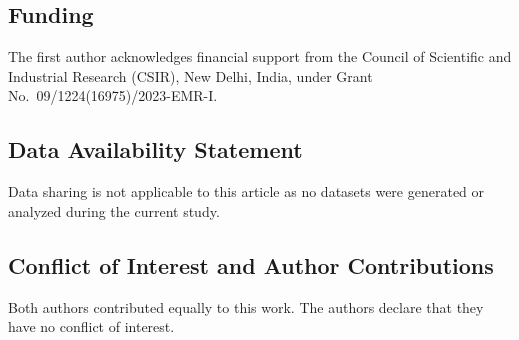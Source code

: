 \documentclass[11pt,reqno]{amsart}
\numberwithin{equation}{section}
\begin{document}
\subsection*{Funding}
The first author acknowledges financial support from the Council of Scientific and Industrial Research (CSIR), New Delhi, India, under Grant No.\ 09/1224(16975)/2023-EMR-I.

\subsection*{Data Availability Statement}
Data sharing is not applicable to this article as no datasets were generated or analyzed during the current study.

\subsection*{Conflict of Interest and Author Contributions}
Both authors contributed equally to this work. The authors declare that they have no conflict of interest.
\end{document}
